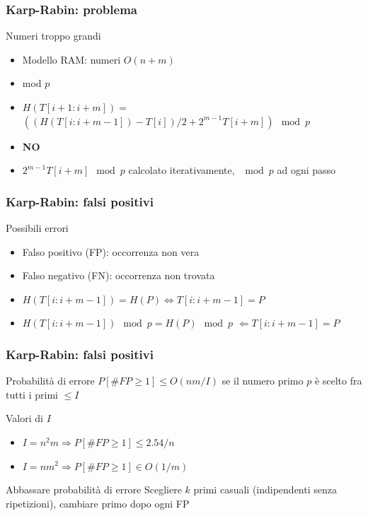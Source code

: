 \begin{frame}[fragile]
\frametitle{Karp-Rabin: problema}
\begin{block}{Numeri troppo grandi}
\begin{itemize}
\item
Modello RAM: numeri $O(n+m)$
\item
mod $p$
\item
$H(T[i+1:i+m]) =$\\
$\left(\left(H(T[i:i+m-1]) - T[i] \right) / 2 + 2^{m-1}T[i+m] \right)\mod p$
\item \textbf{NO}
\item
$2^{m-1}T[i+m] \mod p$ calcolato iterativamente, $\mod p$ ad ogni passo
\end{itemize}
\end{block}
\end{frame}

\begin{frame}[fragile]
\frametitle{Karp-Rabin: falsi positivi}
\begin{block}{Possibili errori}
\begin{itemize}
\item
Falso positivo (FP): occorrenza non vera
\item
Falso negativo (FN): occorrenza non trovata
\item
$H(T[i:i+m-1])=H(P) \Leftrightarrow T[i:i+m-1]=P$
\item
$H(T[i:i+m-1])  \mod p = H(P)  \mod p$
$\Leftarrow T[i:i+m-1]=P$
\end{itemize}
\end{block}
\end{frame}


\begin{frame}[fragile]
\frametitle{Karp-Rabin: falsi positivi}
\begin{block}{Probabilità di errore}
$P[\#FP\ge 1] \le O(nm/I)$ se il numero primo $p$ è scelto fra tutti i primi $\le
I$
\end{block}

\begin{block}{Valori di $I$}
\begin{itemize}
\item
$I=n^{2}m \Rightarrow P[\#FP\ge 1] \le 2.54/n$
\item
$I=nm^{2}  \Rightarrow P[\#FP\ge 1] \in O(1/m)$
\end{itemize}
\end{block}

\begin{block}{Abbassare probabilità di errore}
Scegliere $k$ primi casuali (indipendenti senza ripetizioni), cambiare primo
dopo ogni FP
\end{block}
\end{frame}

